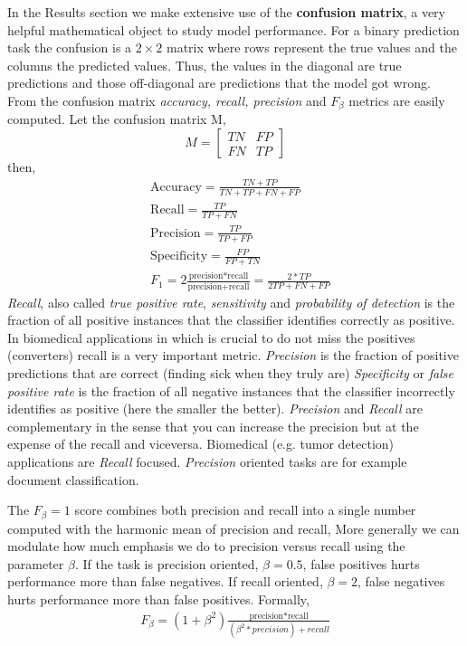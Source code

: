 \documentclass[11pt]{article}
\theoremstyle{definition}
\theoremstyle{remark}
\begin{document}
In the Results section we make extensive use of the \textbf{confusion matrix}, a very helpful mathematical object to study model performance. For a binary prediction task the confusion is a $2 \times 2$ matrix where rows represent the true values and the columns the predicted values. Thus, the values in the diagonal are true predictions and those off-diagonal are predictions that the model got wrong. From the confusion matrix \emph{accuracy, recall, precision} and $F_\beta$ metrics are easily computed.
Let the confusion matrix M,  
\begin{equation*}
M=
  \begin{bmatrix}
    TN & FP  \\
    FN & TP 
  \end{bmatrix}
\end{equation*}
then, 
\begin{equation*}
\begin{split}
&\text{Accuracy} = \frac{TN + TP}{TN+TP+FN+FP} \\
&\text{Recall} = \frac{TP}{TP+FN} \\
&\text{Precision} = \frac{TP}{TP+FP} \\
&\text{Specificity} = \frac{FP}{FP+TN} \\
&F_1 = 2\frac{\text{precision*recall}}{\text{precision}+\text{recall}} = \frac{2 * TP}{2TP + FN + FP}
\end{split}
\end{equation*}
\emph{Recall}, also called \emph{true positive rate}, \emph{sensitivity} and \emph{probability of detection} is the fraction of all positive instances that the classifier identifies correctly as positive. In biomedical applications in which is crucial to do not miss the positives (converters) recall is a very important metric.
\emph{Precision} is the fraction of positive predictions that are correct (finding sick when they truly are)
\emph{Specificity} or \emph{false positive rate} is the fraction of all negative instances that the classifier incorrectly identifies as positive (here the smaller the better).
\emph{Precision} and \emph{Recall} are complementary in the sense that you can increase the precision but at the expense of the recall and viceversa. Biomedical (e.g. tumor detection) applications are \emph{Recall} focused. \emph{Precision} oriented tasks are for example document classification. 

The $F_{\beta}=1$ score combines both precision and recall into a single number computed with the harmonic mean of precision and recall, More generally we can modulate how much emphasis we do to precision versus recall using the parameter $\beta$. 
If the task is precision oriented, $\beta=0.5$, false positives hurts performance more than false negatives. If recall oriented, $\beta=2$, false negatives hurts performance more than false positives. Formally, 
\begin{equation*}
\begin{split}
F_{\beta} = (1+\beta^2)\frac{\text{precision*recall}}{(\beta^2 * precision)+recall} 
\end{split}
\end{equation*}
\end{document}
